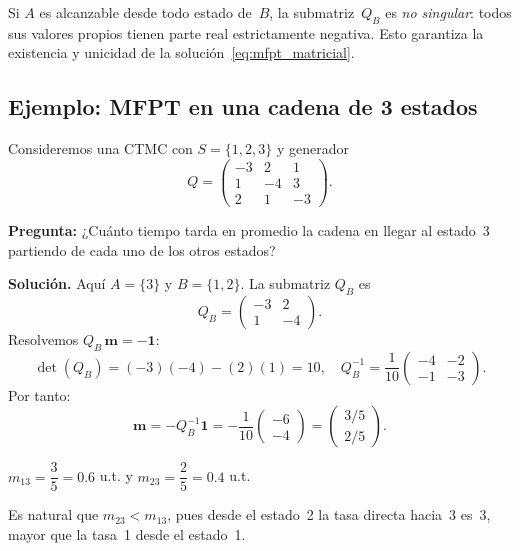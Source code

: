 \documentclass[11pt, letterpaper]{article}
\begin{document}
\begin{notabox}[Invertibilidad de $Q_B$]
  Si $A$ es alcanzable desde todo estado de~$B$, la submatriz~$Q_B$
  es \emph{no singular}: todos sus valores propios tienen parte real
  estrictamente negativa.  Esto garantiza la existencia y unicidad
  de la solución~\eqref{eq:mfpt_matricial}.
\end{notabox}

\subsection{Ejemplo: MFPT en una cadena de 3 estados}

\begin{ejemplobox}
  Consideremos una CTMC con $S=\{1,2,3\}$ y generador
  \[
    Q = \begin{pmatrix}
      -3 &  2 &  1 \\
       1 & -4 &  3 \\
       2 &  1 & -3
    \end{pmatrix}.
  \]

  \textbf{Pregunta:} ¿Cuánto tiempo tarda en promedio la cadena en
  llegar al estado~$3$ partiendo de cada uno de los otros estados?

  \medskip\noindent\textbf{Solución.}
  Aquí $A=\{3\}$ y $B=\{1,2\}$.  La submatriz $Q_B$ es
  \[
    Q_B = \begin{pmatrix} -3 & 2 \\ 1 & -4 \end{pmatrix}.
  \]
  Resolvemos $Q_B\,\mathbf{m}=-\mathbf{1}$:
  \[
    \det(Q_B) = (-3)(-4)-(2)(1) = 10, \quad
    Q_B^{-1} = \frac{1}{10}\begin{pmatrix} -4 & -2 \\ -1 & -3 \end{pmatrix}.
  \]
  Por tanto:
  \[
    \mathbf{m} = -Q_B^{-1}\mathbf{1}
    = -\frac{1}{10}\begin{pmatrix} -6 \\ -4 \end{pmatrix}
    = \begin{pmatrix} 3/5 \\ 2/5 \end{pmatrix}.
  \]
\end{ejemplobox}

\begin{resultadobox}[Resultado]
  $m_{13} = \dfrac{3}{5} = 0.6$ u.t. \quad y \quad $m_{23} = \dfrac{2}{5} = 0.4$ u.t.

  \medskip
  Es natural que $m_{23}<m_{13}$, pues desde el estado~2 la tasa
  directa hacia~3 es~3, mayor que la tasa~1 desde el estado~1.
\end{resultadobox}
\end{document}
